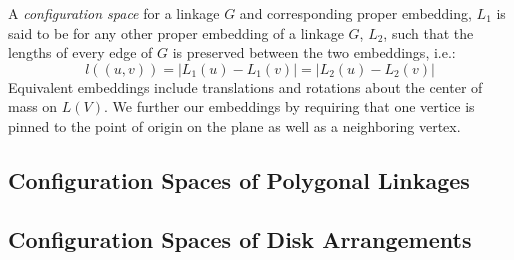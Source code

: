 A \textit{configuration space} for a linkage $G$ and corresponding proper embedding, $L_1$ is said 
to be for any other proper embedding of a linkage $G$, $L_2$, such that the lengths 
of every edge of $G$ is preserved between the two embeddings, i.e.: 
$$l\left( \left(u,v\right) 
\right) = \left\vert 
L_1(u) - L_1(v) \right\vert = \left\vert L_2(u) - L_2(v) \right\vert$$
Equivalent embeddings include translations and rotations about the center of mass on $L(V)$.  We 
further our embeddings by requiring that one vertice is pinned to the point of origin on the plane 
as well as a neighboring vertex.
\subsection{Configuration Spaces of Polygonal Linkages}
\subsection{Configuration Spaces of Disk Arrangements}



















